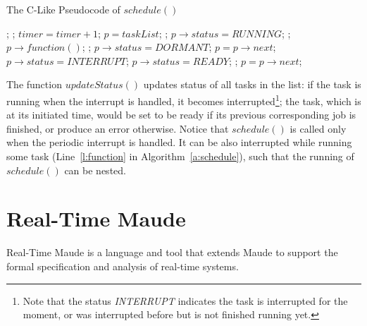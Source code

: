 \documentclass{llncs}
\begin{document}
\begin{algorithm}
  \caption{The C-Like Pseudocode of $schedule()$}
  \label{a:schedule}
  \begin{algorithmic}[1]
  \State {}; 
  \State {}; \label{l:updatestatus}
  \State $timer = timer + 1$; \label{l:timer} \label{l:inc}
  \State $p = taskList$;
   \label{l:startrun1st}
      \State \Return;
      \State $p\rightarrow status = \textit{RUNNING}$;
      \State {};  \label{l:endrun1st}
      \State $p\rightarrow function()$;  \label{l:function}
      \State {};
      \State $p\rightarrow status = \textit{DORMANT}$;
    \EndIf
    \State $p = p\rightarrow next$;
  \EndWhile
\EndFunction
{}
     \label{l:startupdate}
      \State $p\rightarrow status = \textit{INTERRUPT}$;
    \EndIf
     
        \State $p\rightarrow status = \textit{READY}$;
      \Else {}
	\State {}; 
      \EndIf
    \EndIf \label{l:endupdate}
    \State $p = p\rightarrow next$;
  \EndWhile
\EndFunction
  \end{algorithmic}
\end{algorithm}

The function $updateStatus()$ updates status of all tasks in the list:
if the task is running when the interrupt is handled, it becomes
interrupted\footnote{Note that the status \textit{INTERRUPT} indicates
  the task is interrupted for the moment, or was interrupted before
  but is not finished running yet.}; the task, which is at its
initiated time, would be set to be ready if its previous corresponding
job is finished, or produce an error otherwise. Notice that
$schedule()$ is called only when the periodic interrupt is handled. It
can be also interrupted while running some task (Line~\ref{l:function}
in Algorithm~\ref{a:schedule}), such that the running of $schedule()$
can be nested.

\section{Real-Time Maude}
\label{s:rtmaude}
Real-Time Maude is a language and tool that extends Maude to support
the formal specification and analysis of real-time systems.
\end{document}
